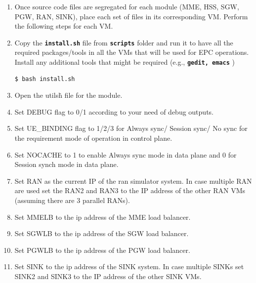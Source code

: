 \pdfminorversion=4\documentclass[hidelinks]{report}
\newcommand{\cf}[1] {
	\textbf{\texttt{#1}}
}
\begin{document}
\begin{enumerate}
\item Once source code files are segregated for each module (MME, HSS, SGW, PGW, RAN, SINK), place each set of files in its corresponding VM. Perform the following steps for each VM.

\item Copy the \cf{install.sh} file from \cf{scripts} folder and run it to have all the required packages/tools in all the VMs that will be used for EPC operations. Install any additional tools that might be required (e.g., \cf{gedit, emacs})

\begin{lstlisting}[language=bash]
$ bash install.sh
\end{lstlisting}



\item Open the utils\.h file for the module.
\item Set DEBUG flag to 0/1 according to your need of debug outputs.
\item Set UE\_BINDING flag to 1/2/3 for Always sync/ Session sync/ No sync for the requirement mode of operation in control plane.
\item Set NOCACHE to 1 to enable Always sync mode in data plane and 0 for Session synch mode in data plane.
\item Set RAN as the current IP of the ran simulator system. In case multiple RAN are used set the RAN2 and RAN3 to the IP address of the other RAN VMs (assuming there are 3 parallel RANs).
\item Set MMELB to the ip address of the MME load balancer.
\item Set SGWLB to the ip address of the SGW load balancer.
\item Set PGWLB to the ip address of the PGW load balancer.
\item Set SINK to the ip address of the SINK system. In case multiple SINKs set SINK2 and SINK3 to the IP address of the other SINK VMs.


\end{enumerate}
\end{document}
